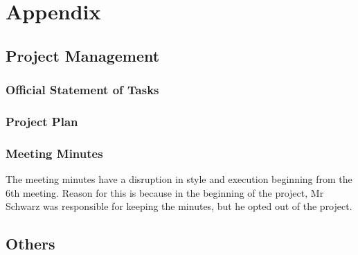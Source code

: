 \documentclass[10pt,a4paper,titlepage,twoside,english,final]{zhawreprt}
\begin{document}
\appendix
\chapter{Appendix}\label{chp:Appendix}
\section{Project Management}\label{sec:ProjectManagement}

\subsection{Official Statement of Tasks}\label{ssec:OfficialStatementOfTasks}

\subsection{Project Plan}\label{ssec:ProjectPlan}


\subsection{Meeting Minutes}\label{ssec:MeetingMinutes}
The meeting minutes have a disruption in style and execution beginning from the 6th meeting.
Reason for this is because in the beginning of the project, Mr Schwarz was responsible for keeping the minutes, but he opted out of the project.











\section{Others}\label{sec:Others}
\end{document}
